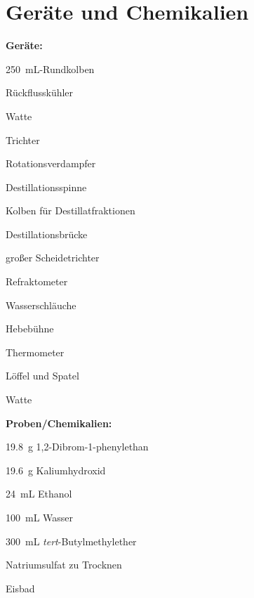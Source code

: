 \section{Geräte und Chemikalien}
\label{sec:geraete}

\textbf{Geräte:}
\begin{itemize}
	\begin{minipage}{0.45\textwidth}
		\item \SI{250}{\milli \liter}-Rundkolben 
		\item Rückflusskühler
		\item Watte
		\item Trichter
		\item Rotationsverdampfer
		\item Destillationsspinne
		\item Kolben für Destillatfraktionen
	\end{minipage}
	\hfill
	\begin{minipage}{0.45\textwidth}
		\item Destillationsbrücke
		\item großer Scheidetrichter
		\item Refraktometer
		\item Wasserschläuche
		\item Hebebühne
		\item Thermometer
		\item Löffel und Spatel
		\item Watte
	\end{minipage}
\end{itemize}

\newpage

\textbf{Proben/Chemikalien:}
\begin{itemize}
	\begin{minipage}{0.55 \textwidth}
		\item \SI{19,8}{\gram} 1,2-Dibrom-1-phenylethan
		\item \SI{19,6}{\gram} Kaliumhydroxid
		\item \SI{24}{\milli \liter} Ethanol
	
	\end{minipage}
\begin{minipage}{0.35 \textwidth}
		\item \SI{100}{\milli \liter} Wasser
	\item \SI{300}{\milli \liter} \textit{tert}-Butylmethylether
	\item Natriumsulfat zu Trocknen
	\item Eisbad
\end{minipage}
\end{itemize}



